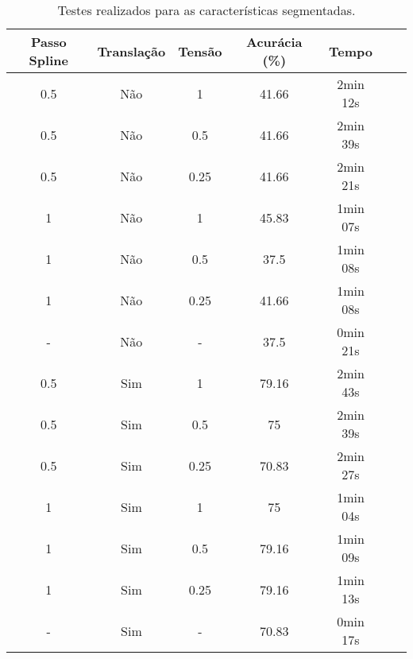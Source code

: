 \begin{table}[h!]
    \centering
    \caption{Testes realizados para as características segmentadas.}
    \begin{tabular}{|c|c|c|c|c|c|c|}
    \hline
    \textbf{Passo Spline} & \textbf{Translação} & \textbf{Tensão} & \textbf{Acurácia (\%)} & \textbf{Tempo} \\
    \hline

    0.5 & Não & 1 & 41.66 & 2min 12s \\
    0.5 & Não & 0.5 & 41.66 & 2min 39s \\
    0.5 & Não & 0.25 & 41.66 & 2min 21s \\

    1 & Não & 1 & 45.83 & 1min 07s \\
    1 & Não & 0.5 & 37.5 & 1min 08s \\
    1 & Não & 0.25 & 41.66 & 1min 08s \\

    - & Não & - & 37.5 & 0min 21s\\

    0.5 & Sim & 1 & 79.16 & 2min 43s \\
    0.5 & Sim & 0.5 & 75 & 2min 39s \\
    0.5 & Sim & 0.25 & 70.83 & 2min 27s \\
 
    1 & Sim & 1 & 75 & 1min 04s \\
    1 & Sim & 0.5 & 79.16 & 1min 09s \\
    1 & Sim & 0.25 & 79.16 & 1min 13s \\

    - & Sim & - & 70.83 & 0min 17s\\
    \hline
    \end{tabular}
\end{table}
